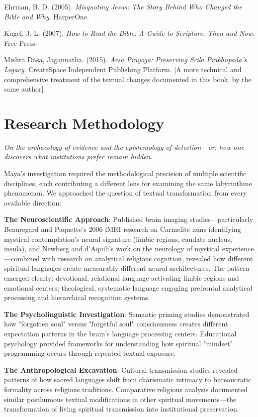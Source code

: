 \documentclass[12pt]{article}
\begin{document}
Ehrman, B. D. (2005). \textit{Misquoting Jesus: The Story Behind Who Changed the Bible and Why}. HarperOne.

Kugel, J. L. (2007). \textit{How to Read the Bible: A Guide to Scripture, Then and Now}. Free Press.

Mishra Dasa, Jagannatha. (2015). \textit{Arsa Prayoga: Preserving Srila Prabhupada's Legacy}. CreateSpace Independent Publishing Platform.
[A more technical and comprehensive treatment of the textual changes documented in this book, by the same author]

\clearpage

\section*{Research Methodology}

\textit{On the archaeology of evidence and the epistemology of detection—or, how one discovers what institutions prefer remain hidden.}

Maya's investigation required the methodological precision of multiple scientific disciplines, each contributing a different lens for examining the same labyrinthine phenomenon. We approached the question of textual transformation from every available direction:

\textbf{The Neuroscientific Approach}: Published brain imaging studies—particularly Beauregard and Paquette's 2006 fMRI research on Carmelite nuns identifying mystical contemplation's neural signature (limbic regions, caudate nucleus, insula), and Newberg and d'Aquili's work on the neurology of mystical experience—combined with research on analytical religious cognition, revealed how different spiritual languages create measurably different neural architectures. The pattern emerged clearly: devotional, relational language activating limbic regions and emotional centers; theological, systematic language engaging prefrontal analytical processing and hierarchical recognition systems.

\textbf{The Psycholinguistic Investigation}: Semantic priming studies demonstrated how "forgotten soul" versus "forgetful soul" consciousness creates different expectation patterns in the brain's language processing centers. Educational psychology provided frameworks for understanding how spiritual "mindset" programming occurs through repeated textual exposure.

\textbf{The Anthropological Excavation}: Cultural transmission studies revealed patterns of how sacred languages shift from charismatic intimacy to bureaucratic formality across religious traditions. Comparative religious analysis documented similar posthumous textual modifications in other spiritual movements—the transformation of living spiritual transmission into institutional preservation.
\end{document}
